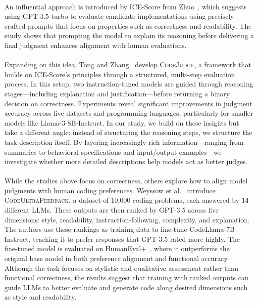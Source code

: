 \documentclass[a4paper]{usiinfbachelorproject}
\begin{document}
\\[2pt]
An influential approach is introduced by ICE-Score from Zhuo~\cite{zhuo2023icescore}, which suggests using GPT-3.5-turbo to evaluate candidate implementations using precisely crafted prompts that focus on properties such as correctness and readability. The study shows that prompting the model to explain its reasoning before delivering a final judgment enhances alignment with human evaluations.\\
\\[2pt]
Expanding on this idea, Tong and Zhang~\cite{tong2024codejudge} develop \textsc{CodeJudge}, a framework that builds on ICE-Score’s principles through a structured, multi-step evaluation process. In this setup, two instruction-tuned models are guided through reasoning stages—including explanation and justification—before returning a binary decision on correctness. Experiments reveal significant improvements in judgment accuracy across five datasets and programming languages, particularly for smaller models like Llama-3-8B-Instruct. In our study, we build on these insights but take a different angle: instead of structuring the reasoning steps, we structure the task description itself. By layering increasingly rich information—ranging from summaries to behavioral specifications and input/output examples—we investigate whether more detailed descriptions help models act as better judges.\\
\\[2pt]
While the studies above focus on correctness, others explore how to align model judgments with human coding preferences. Weyssow et al.~\cite{weyssow2024codeultrafeedback} introduce \textsc{CodeUltraFeedback}, a dataset of 10,000 coding problems, each answered by 14 different LLMs. These outputs are then ranked by GPT-3.5 across five dimensions: style, readability, instruction-following, complexity, and explanation. The authors use these rankings as training data to fine-tune CodeLlama-7B-Instruct, teaching it to prefer responses that GPT-3.5 rated more highly. The fine-tuned model is evaluated on HumanEval+~\cite{lzi2023humanevalplus}, where it outperforms the original base model in both preference alignment and functional accuracy. Although the task focuses on stylistic and qualitative assessment rather than functional correctness, the results suggest that training with ranked outputs can guide LLMs to better evaluate and generate code along desired dimensions such as style and readability.\\
\\[2pt]
\end{document}
